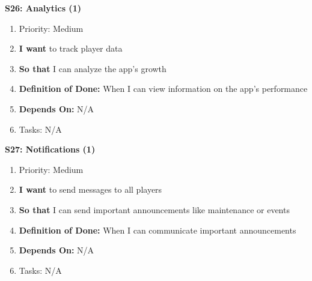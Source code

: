 \textbf{S26: Analytics (1)}
\begin{enumerate}
    \item Priority: Medium
    \item \textbf{I want} to track player data
    \item \textbf{So that} I can analyze the app's growth
    \item \textbf{Definition of Done:} When I can view information on the app's performance
    \item \textbf{Depends On:} N/A
    \item Tasks: N/A
\end{enumerate}


\textbf{S27: Notifications (1)}
\begin{enumerate}
    \item Priority: Medium
    \item \textbf{I want} to send messages to all players
    \item \textbf{So that} I can send important announcements like maintenance or events
    \item \textbf{Definition of Done:} When I can communicate important announcements
    \item \textbf{Depends On:} N/A
    \item Tasks: N/A
\end{enumerate}



